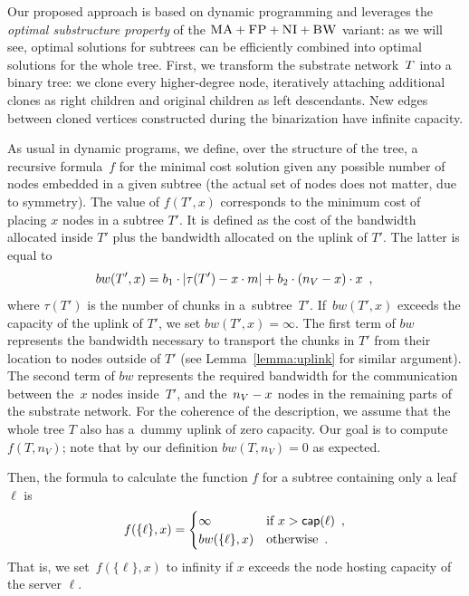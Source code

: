  Our proposed approach is based on dynamic programming and
leverages the \emph{optimal substructure property} of the $\textsc{MA}+\textsc{FP}+\textsc{NI}+\textsc{BW}$ variant:
as we will see, optimal solutions for subtrees
can be efficiently combined into optimal solutions for the whole tree.
First, we transform the
substrate network~$T$
into a binary tree:
we clone every higher-degree node,
iteratively attaching additional clones as right children
and original children as left descendants.
New edges between cloned vertices constructed during the binarization have infinite capacity.

As usual in dynamic programs, we define, over the structure of the tree, a
recursive formula~$f$ for
the minimal cost solution given any possible number of nodes
embedded in a given subtree (the actual set of nodes does not matter,
due to symmetry).
The value of $f(T', x)$ corresponds to the minimum cost of placing $x$ nodes in a subtree $T'$.
It is defined as the cost of the bandwidth allocated inside $T'$ plus the bandwidth allocated on the uplink of $T'$.
The latter is equal to
\[
bw(T',x) = 
    b_1\cdot|\tau(T')-x\cdot m| +b_2 \cdot
(n_V - x) \cdot x\enspace, \\
  \]
  where $\tau(T')$ is the number of chunks in a~subtree~$T'$.
  If~$bw(T',x)$ exceeds the capacity of the uplink of $T'$, we set $bw(T', x) = \infty$.
  The first term of $bw$ represents
the bandwidth necessary to transport the chunks in $T'$ from their location to
nodes outside of $T'$ (see Lemma~\ref{lemma:uplink} for similar argument).
The second term of $bw$ represents the required bandwidth for the communication between the~$x$
nodes inside~$T'$, and the~$n_V - x$ nodes in the remaining parts of the substrate
network.
For the coherence of the description, we assume that the whole tree $T$ also has a~dummy uplink of zero capacity.
Our goal is to compute $f(T, n_V)$; note that by our definition $bw(T, n_V) = 0$ as expected.

Then, the formula to calculate the function $f$ for a subtree containing only a leaf $\ell$ is
\[
f(\{ \ell \}, x) =
\begin{cases}
   \infty & \mbox{if } x > \textsf{cap}(\ell)\enspace,\\
    bw(\{ \ell \}, x) & \mbox{otherwise}\enspace. \\
  \end{cases}
  \]
That is, we set~$f(\{ \ell \},x)$ to infinity if $x$ exceeds the node hosting capacity of the server $\ell$.

